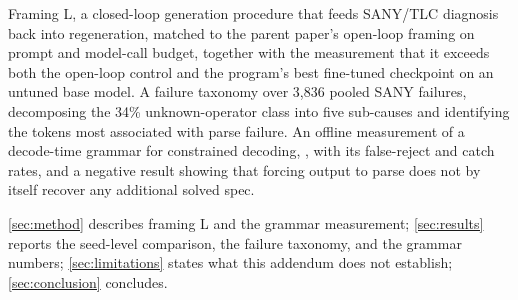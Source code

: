  Framing L, a closed-loop generation
procedure that feeds SANY/TLC diagnosis back into regeneration, matched to the
parent paper's open-loop framing on prompt and model-call budget, together
with the measurement that it exceeds both the open-loop control and the
program's best fine-tuned checkpoint on an untuned base model.
 A failure taxonomy over 3,836 pooled SANY failures, decomposing the
34\% unknown-operator class into five sub-causes and identifying the tokens
most associated with parse failure.
 An offline measurement of a decode-time grammar for constrained
\tlaplus{} decoding, \gfile{}, with its false-reject and
catch rates, and a negative result showing that forcing output to parse does
not by itself recover any additional solved spec.

 \autoref{sec:method} describes framing L and the grammar
measurement; \autoref{sec:results} reports the seed-level comparison, the
failure taxonomy, and the grammar numbers; \autoref{sec:limitations} states
what this addendum does not establish; \autoref{sec:conclusion} concludes.
